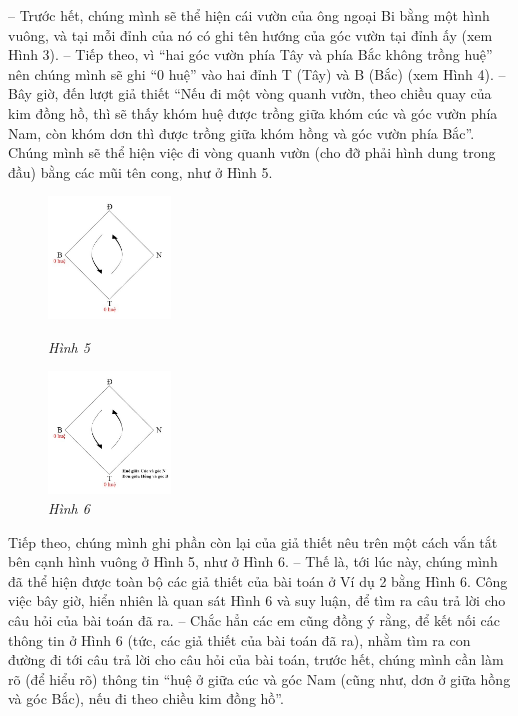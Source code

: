 	-- Trước hết, chúng mình sẽ thể hiện cái vườn của ông ngoại Bi bằng một hình vuông, và tại mỗi đỉnh của nó có ghi tên hướng của góc vườn tại đỉnh ấy (xem Hình 3).
	\vskip 0.15cm
	-- Tiếp theo, vì “hai góc vườn phía Tây và phía Bắc không trồng huệ” nên chúng mình sẽ ghi “0 huệ” vào hai đỉnh T (Tây) và B (Bắc) (xem Hình 4).
	\vskip 0.15cm
	-- Bây giờ, đến lượt giả thiết “Nếu đi một vòng quanh vườn, theo chiều quay của kim đồng hồ, thì sẽ thấy khóm huệ được trồng giữa khóm cúc và góc vườn phía Nam, còn khóm dơn thì được trồng giữa khóm hồng và góc vườn phía Bắc”. Chúng mình sẽ thể hiện việc đi vòng quanh vườn (cho đỡ phải hình dung trong đầu) bằng các mũi tên cong, như ở Hình 5.
	\vskip 0.1cm
	\begin{figure}
		\vspace*{-15pt}
		\centering
		\captionsetup{labelformat=empty, justification=centering}
		\hspace*{-10pt}\includegraphics[width= 0.29\textwidth]{pic5}
		\caption{\textit{\small Hình 5}}
		\vspace*{5pt}
		\hspace*{-10pt}\includegraphics[width=0.29\textwidth]{pic6}
		\caption{\small\textit{Hình 6}}
		\vspace*{-20pt}
	\end{figure}
	\vskip 0.15cm
	Tiếp theo, chúng mình ghi phần còn lại của giả thiết nêu trên một cách vắn tắt bên cạnh hình vuông ở Hình 5, như ở Hình 6.
	\vskip 0.15cm
	-- Thế là, tới lúc này, chúng mình đã thể hiện được toàn bộ các giả thiết của bài toán ở Ví dụ 2 bằng Hình 6. Công việc bây giờ, hiển nhiên là quan sát Hình 6 và suy luận, để tìm ra câu trả lời cho câu hỏi của bài toán đã ra.
	\vskip 0.15cm
	-- Chắc hẳn các em cũng đồng ý rằng, để kết nối các thông tin ở Hình 6 (tức, các giả thiết của bài toán đã ra), nhằm tìm ra con đường đi tới câu trả lời cho câu hỏi của bài toán, trước hết, chúng mình cần làm rõ (để hiểu rõ) thông tin “huệ ở giữa cúc và góc Nam (cũng như, dơn ở giữa hồng và góc Bắc), nếu đi theo chiều kim đồng hồ”.
